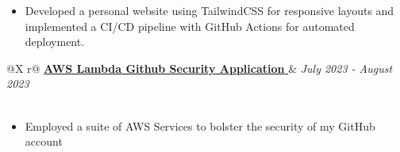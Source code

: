 \documentclass[a4paper,12pt]{article}
\begin{document}
\begin{minipage}{\linewidth}
    \begin{itemize}[nosep,after=\strut, leftmargin=1em]
    \item Developed a personal website using TailwindCSS for responsive layouts and implemented a CI/CD pipeline with GitHub Actions for automated deployment.
    \end{itemize}
\end{minipage}




    

\begin{tabularx}{\linewidth}{ @{}X r@{} }
    \href{https://github.com/IshanPhadte776/LambdaEventTriggering}{\textbf{AWS Lambda Github Security Application }} & \textit{July 2023 - August 2023} \\
     \\
\end{tabularx}

\begin{minipage}{\linewidth}
    \begin{itemize}[nosep,after=\strut, leftmargin=1em]
    \item Employed a suite of AWS Services to bolster the security of my GitHub account
    \end{itemize}
\end{minipage}



\end{document}
